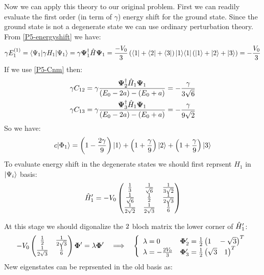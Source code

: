 \begin{homeworkProblem}
Now we can apply this theory to our original problem. First we can readily evaluate the first order (in term of $\gamma$) energy shift for the ground state. Since the ground state is not a degenerate state we can use ordinary perturbation theory. From \eqref{P5-energyshift} we have:
\begin{equation}
\gamma E_1^{(1)}=\langle \Psi_1|\gamma H_1|\Psi_1\rangle=\gamma\mathbf{\Psi}_1^\dagger \Hat{H}\mathbf{\Psi}_1=\frac{-V_0}{3}\left(\langle 1|+\langle 2|+\langle 3|\right)|1\rangle\langle 1|\left(|1\rangle+|2\rangle+|3\rangle\right)=-\frac{V_0}{3}
\end{equation}
If we use \eqref{P5-Cnm} then:
\begin{align}
&\gamma C_{12}=\gamma\frac{\mathbf{\Psi}_2^\dagger\Hat{H}_1\mathbf{\Psi}_1}{(E_0-2a)-(E_0+a)}=
-\frac{\gamma}{3\sqrt{6}}\\
&\gamma C_{13}=\gamma\frac{\mathbf{\Psi}_3^\dagger\Hat{H}_1\mathbf{\Psi}_1}{(E_0-2a)-(E_0+a)}=
-\frac{\gamma}{9\sqrt{2}}
\end{align}
So we have:
\begin{equation}\label{P5-ground}
c|\Phi_1\rangle=\left(1-\frac{2\gamma}{9}\right)|1\rangle+\left(1+\frac{\gamma}{9}\right)|2\rangle+\left(1+\frac{\gamma}{9}\right)|3\rangle
\end{equation}
To evaluate energy shift in the degenerate states we should first reprsent $H_1$ in $|\Psi_i\rangle$ basis:
\begin{equation}
\Hat{H}'_1=-V_0
\begin{pmatrix}
\frac{1}{3} & \frac{1}{\sqrt{6}} &\frac{1}{3\sqrt{2}}\\
\frac{1}{\sqrt{6}} & \frac{1}{2} & \frac{1}{2\sqrt{3}}\\
\frac{1}{2\sqrt{2}} & \frac{1}{2\sqrt{3}} & \frac{1}{6}
\end{pmatrix}
\end{equation}

At this stage we should digonalize the $2\time 2$ bloch matrix the lower corner of $\Hat{H}'_1$:
\begin{equation}
-V_0
\begin{pmatrix}
 \frac{1}{2} & \frac{1}{2\sqrt{3}}\\
 \frac{1}{2\sqrt{3}} & \frac{1}{6}
\end{pmatrix}\mathbf{\Phi}'
=\lambda \mathbf{\Phi}'\quad\Longrightarrow\quad 
\left\{
\begin{array}{ll}
\lambda=0 & \mathbf{\Phi}'_2=\frac{1}{2}\left(1\quad -\sqrt{3}\right)^T\\
\lambda=-\frac{2V_0}{3}& \mathbf{\Phi}'_3=\frac{1}{2}\left(\sqrt{3}\quad 1\right)^T\\
\end{array}
\right.
\end{equation}
New eigenstates can be reprsented in the old basis as:


\end{homeworkProblem}
